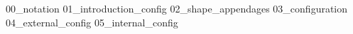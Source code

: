 {00_notation}
\pagebreak
{}
{01_introduction_config}
{02_shape_appendages}
{03_configuration}
{04_external_config}
{05_internal_config}